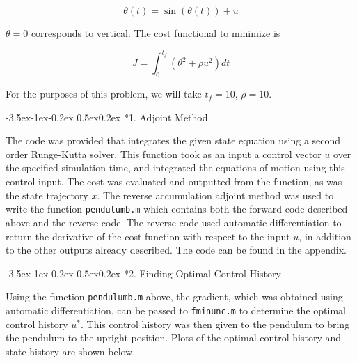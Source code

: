 \documentclass[11pt,letterpaper,onecolumn,notitlepage]{article}
\makeatletter
\renewcommand\subsection{\@startsection{subsection}{1}{\z@}%
{-3.5ex\@plus-1ex\@minus-0.2ex}%
{0.5ex\@plus0.2ex}%
{\fontsize{10pt}{10pt}\selectfont\bfseries\sffamily}}
\makeatother
\begin{document}
  \begin{equation*}
    \ddot{\theta}(t)=\sin(\theta(t))+u
  \end{equation*}

  $\theta=0$ corresponds to vertical.
  The cost functional to minimize is

  \begin{equation*}
    J=\int_{0}^{t_{f}}(\theta^{2}+\rho u^{2})dt
  \end{equation*}

  For the purposes of this problem, we will take $t_{f}=10$, $\rho=10$.

  \subsection*{1. Adjoint Method}


  The code was provided that integrates the given state equation using a second order Runge-Kutta solver.
  This function took as an input a control vector $u$ over the specified simulation time, and integrated the equations of motion using this control input.
  The cost was evaluated and outputted from the function, as was the state trajectory $x$.
  The reverse accumulation adjoint method was used to write the function \texttt{pendulum\textunderscore{}b.m} which contains both the forward code described above and the reverse code.
  The reverse code used automatic differentiation to return the derivative of the cost function with respect to the input $u$, in addition to the other outputs already described.
  The code can be found in the appendix.

  \subsection*{2. Finding Optimal Control History}

  Using the function \texttt{pendulum\textunderscore{}b.m} above, the gradient, which was obtained using automatic differentiation, can be passed to \texttt{fminunc.m} to determine the optimal control history $u^{*}$.
  This control history was then given to the pendulum to bring the pendulum to the upright position.
  Plots of the optimal control history and state history are shown below.
\end{document}
